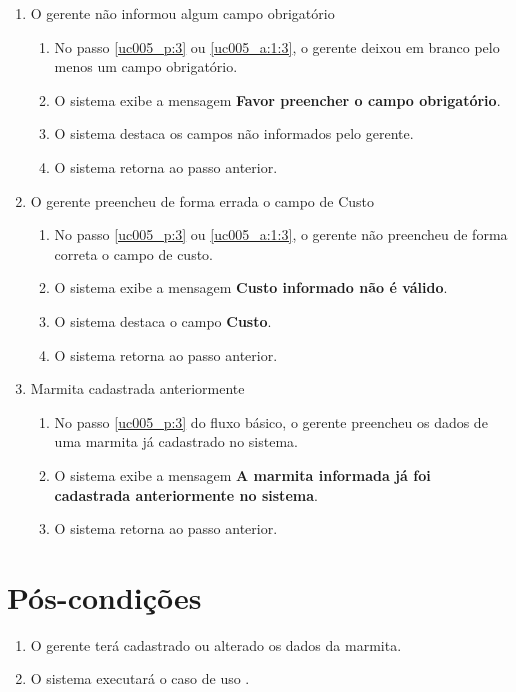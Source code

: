 \begin{enumerate}[label=E\arabic*]	
	\item O gerente não informou algum campo obrigatório \label{uc005_e:1}
	\begin{enumerate}[label*=.\arabic*]
		\item[] No passo \ref{uc005_p:3} ou \ref{uc005_a:1:3}, o gerente deixou em branco pelo menos um campo obrigatório.
		\item O sistema exibe a mensagem \textbf{Favor preencher o campo obrigatório}.
		\item O sistema destaca os campos não informados pelo gerente.
		\item O sistema retorna ao passo anterior.
	\end{enumerate}
	
	\item O gerente preencheu de forma errada o campo de Custo \label{uc005_e:2}
	\begin{enumerate}[label*=.\arabic*]		
		\item[] No passo \ref{uc005_p:3} ou \ref{uc005_a:1:3}, o gerente não preencheu de forma correta o campo de custo.		
		\item O sistema exibe a mensagem \textbf{Custo informado não é válido}.
		\item O sistema destaca o campo \textbf{Custo}.
		\item O sistema retorna ao passo anterior.
	\end{enumerate}
		
	\item Marmita cadastrada anteriormente \label{uc005_e:3}
	\begin{enumerate}[label*=.\arabic*]
		\item[] No passo \ref{uc005_p:3} do fluxo básico, o gerente preencheu os dados de uma marmita já cadastrado no sistema.
		\item O sistema exibe a mensagem \textbf{A marmita informada já foi cadastrada anteriormente no sistema}.
		\item O sistema retorna ao passo anterior.
	\end{enumerate}
\end{enumerate}

\section{Pós-condições}

\begin{enumerate}
	\item O gerente terá cadastrado ou alterado os dados da marmita.
	\item O sistema executará o caso de uso .	
\end{enumerate}


